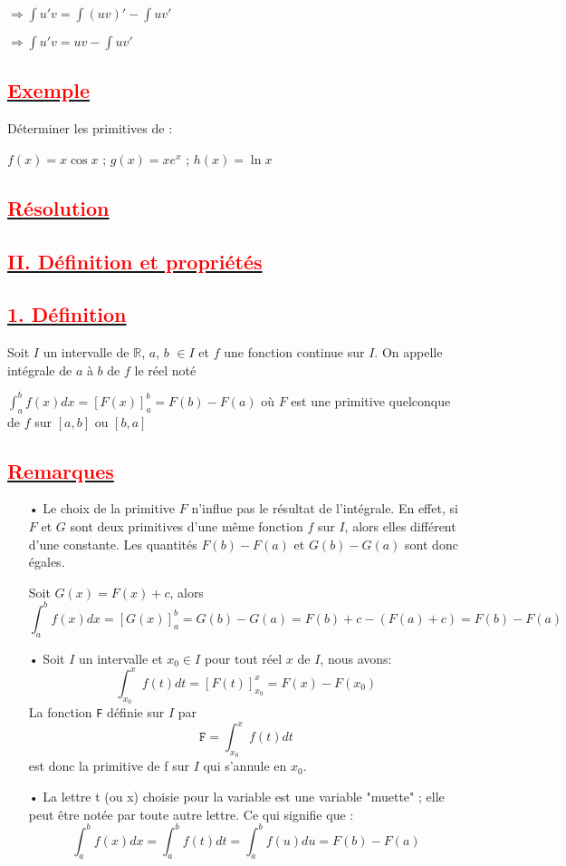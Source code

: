 \documentclass[12pt]{article}
\begin{document}
$\Longrightarrow \int u'v=\int (uv)'-\int uv'$ 

$\Longrightarrow \int u'v=uv-\int uv'$ 
\subsection*{\underline{\textbf{\textcolor{red}{Exemple}}}}
Déterminer les primitives de :

$f(x)=x\cos x$ ; $g(x)=xe^{x}$ ; $h(x)=\ln x$
\subsection*{\underline{\textbf{\textcolor{red}{Résolution }}}}
\subsection*{\underline{\textbf{\textcolor{red}{II. Définition et propriétés}}}}
\subsection*{\underline{\textbf{\textcolor{red}{1. Définition }}}}
Soit $I$ un intervalle de $\mathbb{R}$, $a$, $b$ $\in I$ et $f$ une fonction continue sur $I$. On appelle intégrale de $a$ à $b$ de $f$ le réel noté

$\int_{a}^{b}f(x)dx=[F(x)]_{a}^{b}=F(b)-F(a)$ où $F$ est une primitive quelconque de $f$ sur 
$[a,b]$ ou $[b,a]$
\subsection*{\underline{\textbf{\textcolor{red}{Remarques }}}}
\begin{itemize}
\item[•] Le choix de la primitive $F$ n'influe pas le résultat de l'intégrale. En effet, si $F$ et $G$ sont deux primitives d'une même fonction $f$ sur $I$, alors elles différent d'une constante. Les quantités $F(b)-F(a)$ et $G(b)-G(a)$ sont donc égales.

Soit $G(x)=F(x)+c$, alors \[\int_{a}^{b}f(x)dx=[G(x)]_{a}^{b}
=G(b)-G(a)=F(b)+c-(F(a)+c)=F(b)-F(a)\]
\item[•] Soit $I$ un intervalle et $x_{0}\in I$ pour tout réel $x$ de $I$, nous avons:
		\[\int_{x_{0}}^{x}f(t)dt=[F(t)]_{x_{0}}^{x}=F(x)-F(x_{0})\]
La fonction \texttt{F} définie sur $I$ par \[\texttt{F}=\int_{x_{0}}^{x}f(t)dt\]
est donc la primitive de f sur $I$ qui s'annule en $x_{0}$.
\item[•] La lettre t (ou x) choisie pour la variable est une variable "muette" ; elle peut être notée par toute autre lettre. Ce qui signifie que :
\[\int_{a}^{b}f(x)dx=\int_{a}^{b}f(t)dt=\int_{a}^{b}f(u)du=F(b)-F(a) \]
\end{itemize}
\end{document}
